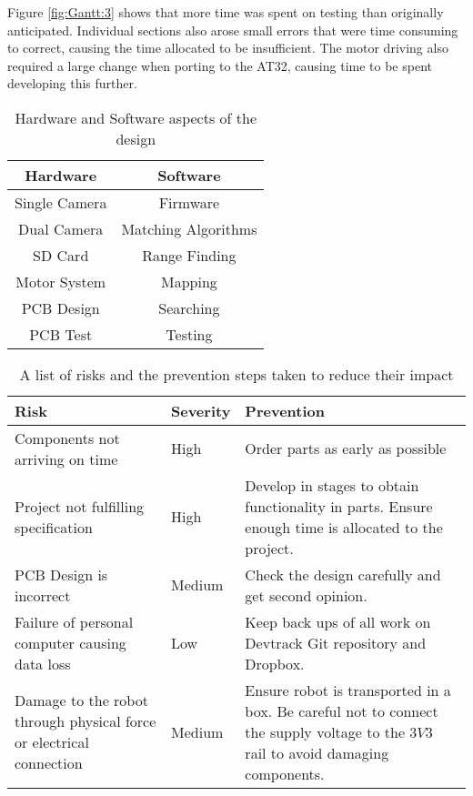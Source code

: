 Figure \ref{fig:Gantt:3} shows that more time was spent on testing than originally anticipated. Individual sections also arose small errors that were time consuming to correct, causing the time allocated to be insufficient. The motor driving also required a large change when porting to the AT32, causing time to be spent developing this further. 

\begin{table}
\centering
\caption{Hardware and Software aspects of the design}
\label{table:sections}
\begin{tabular}{cc}\toprule
\textbf{Hardware} & \textbf{Software} \\ \toprule
Single Camera	&	Firmware \\ \midrule
Dual Camera		&	Matching Algorithms \\ \midrule
SD Card			&	Range Finding \\ \midrule
Motor System	&	Mapping  \\ \midrule
PCB Design		&	Searching \\ \midrule
PCB Test		&	Testing \\ \bottomrule
\end{tabular}
\end{table}

\begin{table}
\centering
\caption{A list of risks and the prevention steps taken to reduce their impact}
\label{tab:risk}
\begin{tabular}{p{6cm}p{2cm}p{6cm}}\toprule
\textbf{Risk}						&	\textbf{Severity}	&	\textbf{Prevention} \\ \toprule
Components not arriving on time	&	High		&	Order parts as early as possible \\ \midrule
Project not fulfilling specification				&	High		&	Develop in stages to obtain functionality in parts. Ensure enough time is allocated to the project.	\\\midrule
PCB Design is incorrect		&	Medium		&	Check the design carefully and get second opinion. \\\midrule
Failure of personal computer causing data loss & Low	& 	Keep back ups of all work on Devtrack Git repository and Dropbox.\\ \midrule
Damage to the robot through physical force or electrical connection & Medium & Ensure robot is transported in a box. Be careful not to connect the supply voltage to the $3V3$ rail to avoid damaging components. \\
\bottomrule
\end{tabular}
\end{table}

